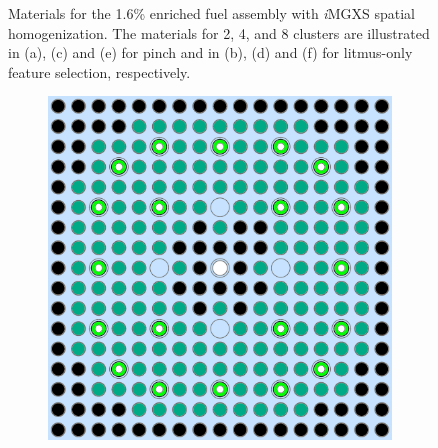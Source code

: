 \begin{figure}[h!]
\begin{subfigure}{0.47\textwidth}
  \caption{}
  \label{fig:chap10-assm-16-combined-8}
\end{subfigure}
\caption[Clustered geometries for a 1.6\% enriched assembly]{Materials for the 1.6\% enriched fuel assembly with \textit{i}\ac{MGXS} spatial homogenization. The materials for 2, 4, and 8 clusters are illustrated in (a), (c) and (e) for pinch and in (b), (d) and (f) for litmus-only feature selection, respectively.}
\label{fig:chap10-assm-16-geometries}
\end{figure}

\clearpage

\begin{figure}[h!]
\centering
\begin{subfigure}{0.47\textwidth}
  \centering
  \includegraphics[width=0.9\linewidth]{figures/unsupervised/geometries/with-features/2-clusters/pinch/assm-31-20BPs}
  \caption{}
  \label{fig:chap10-assm-31-20BPs-pinch-2}
\end{subfigure}%
\begin{subfigure}{0.47\textwidth}
  \centering

\end{subfigure}
\end{figure}
